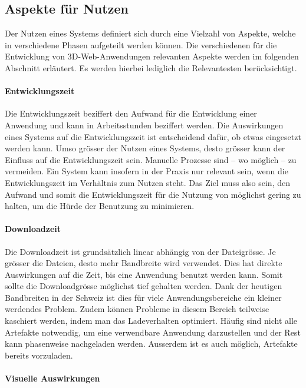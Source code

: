 \subsection{Aspekte für Nutzen}

Der Nutzen eines Systems definiert sich durch eine Vielzahl von Aspekte, welche in verschiedene Phasen aufgeteilt werden können. Die verschiedenen für die Entwicklung von 3D-Web-Anwendungen relevanten Aspekte werden im folgenden Abschnitt erläutert. Es werden hierbei lediglich die Relevantesten berücksichtigt.

\paragraph{Entwicklungszeit}

Die Entwicklungszeit beziffert den Aufwand für die Entwicklung einer Anwendung und kann in Arbeitsstunden beziffert werden.
Die Auswirkungen eines Systems auf die Entwicklungszeit ist entscheidend dafür, ob etwas eingesetzt werden kann. Umso grösser der Nutzen eines Systems, desto grösser kann der Einfluss auf die Entwicklungszeit sein. Manuelle Prozesse sind – wo möglich – zu vermeiden. Ein System kann insofern in der Praxis nur relevant sein, wenn die Entwicklungszeit im Verhältnis zum Nutzen steht. Das Ziel muss also sein, den Aufwand und somit die Entwicklungszeit für die Nutzung von  möglichst gering zu halten, um die Hürde der Benutzung zu minimieren.

\paragraph{Downloadzeit}

Die Downloadzeit ist grundsätzlich linear abhängig von der Dateigrösse.
Je grösser die Dateien, desto mehr Bandbreite wird verwendet. Dies hat direkte Auswirkungen auf die Zeit, bis eine Anwendung benutzt werden kann. Somit sollte die Downloadgrösse möglichst tief gehalten werden.
Dank der heutigen Bandbreiten in der Schweiz ist dies für viele Anwendungsbereiche ein kleiner werdendes Problem.
Zudem können Probleme in diesem Bereich teilweise kaschiert werden, indem man das Ladeverhalten optimiert. Häufig sind nicht alle Artefakte notwendig, um eine verwendbare Anwendung darzustellen und der Rest kann phasenweise nachgeladen werden.
Ausserdem ist es auch möglich, Artefakte bereits vorzuladen.

\paragraph{Visuelle Auswirkungen}

